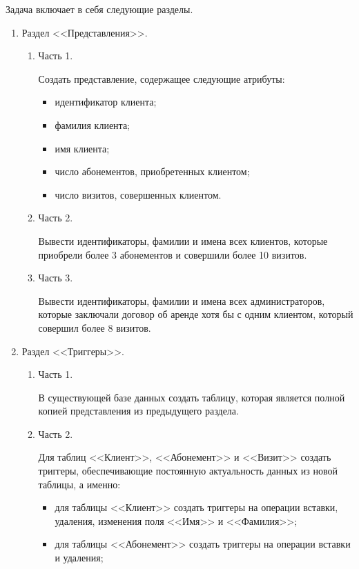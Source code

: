 \documentclass[11pt, a4paper]{article}
\begin{document}
	Задача включает в себя следующие разделы.
	\begin{enumerate}
		\item Раздел <<Представления>>.
		\begin{enumerate}
			\item Часть 1.
			
			Создать представление, содержащее следующие атрибуты:
			\begin{itemize}
				\item идентификатор клиента;
				\item фамилия клиента;
				\item имя клиента;
				\item число абонементов, приобретенных клиентом;
				\item число визитов, совершенных клиентом.
			\end{itemize}
			
			
			\item Часть 2.
			
			Вывести идентификаторы, фамилии и имена всех клиентов, которые приобрели более 3 абонементов и совершили более 10 визитов.
			
			
			\item Часть 3.
			
			Вывести идентификаторы, фамилии и имена всех администраторов, которые заключали договор об аренде хотя бы с одним клиентом, который совершил более 8 визитов.
			
		\end{enumerate}
		
		
		\item Раздел <<Триггеры>>.
		\begin{enumerate}
			\item Часть 1.
			
			В существующей базе данных создать таблицу, которая является полной копией представления из предыдущего раздела.
			
			
			\item Часть 2.
			
			Для таблиц <<Клиент>>, <<Абонемент>> и <<Визит>> создать триггеры, обеспечивающие постоянную актуальность данных из новой таблицы, а именно:
			\begin{itemize}
				\item для таблицы <<Клиент>> создать триггеры на операции вставки, удаления, изменения поля <<Имя>> и <<Фамилия>>;
				
				\item для таблицы <<Абонемент>> создать триггеры на операции вставки и удаления;
				

\end{itemize}
\end{enumerate}
\end{enumerate}
\end{document}
